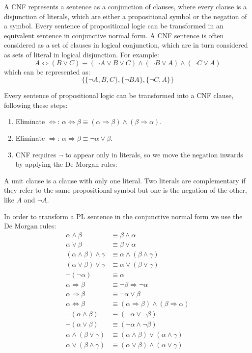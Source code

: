 \documentclass{article}
\begin{document}
A CNF represents a sentence as a conjunction of clauses, where every clause is a disjunction of literals, which are either a propositional symbol or the negation of a symbol. Every sentence of propositional logic can be transformed in an equivalent sentence in conjunctive normal form. A CNF sentence is often considered as a set of clauses in logical conjunction, which are in turn considered as sets of literal in logical disjunction. For example:
    \[A\Leftrightarrow(B\lor C) \equiv (\neg A \lor B \lor C) \land (\neg B \lor A) \land (\neg C \lor A)\]
which can be represented as:
    \[\{\{\neg A, B, C\}, \{\neg B A\}, \{\neg C, A\}\}\]

Every sentence of propositional logic can be transformed into a CNF clause, following these steps:
\begin{enumerate}
    \item Eliminate $\Leftrightarrow$: $\alpha \Leftrightarrow \beta \equiv (\alpha \Rightarrow \beta) \land (\beta \Rightarrow \alpha)$.
    \item Eliminate $\Rightarrow$: $\alpha \Rightarrow \beta \equiv \neg \alpha \lor \beta$.
    \item CNF requires $\neg$ to appear only in literals, so we move the negation inwards by applying the De Morgan rules:
    
\end{enumerate}

A unit clause is a clause with only one literal. Two literals are complementary if they refer to the same propositional symbol but one is the negation of the other, like \textit{A} and $\neg A$.

In order to transform a PL sentence in the conjunctive normal form we use the De Morgan rules:
\begin{align*}
    \alpha \land \beta &\equiv \beta \land \alpha \\
    \alpha \lor \beta &\equiv \beta \lor \alpha \\
    (\alpha \land \beta)\land \gamma &\equiv \alpha \land (\beta \land \gamma) \\
    (\alpha \lor \beta)\lor \gamma &\equiv \alpha \lor (\beta \lor \gamma) \\
    \neg (\neg \alpha) &\equiv \alpha \\
    \alpha \Rightarrow \beta &\equiv \neg \beta \Rightarrow \neg \alpha \\
    \alpha \Rightarrow \beta &\equiv \neg \alpha \lor \beta \\
    \alpha\Leftrightarrow\beta &\equiv (\alpha\Rightarrow\beta) \land (\beta\Rightarrow\alpha) \\
    \neg (\alpha \land \beta) &\equiv (\neg \alpha \lor \neg \beta) \\
    \neg (\alpha \lor \beta) &\equiv (\neg \alpha \land \neg \beta) \\
    \alpha \land (\beta \lor \gamma) &\equiv (\alpha\land\beta)\lor(\alpha\land\gamma) \\
    \alpha \lor (\beta \land \gamma) &\equiv (\alpha \lor \beta)\land(\alpha \lor \gamma)
\end{align*}
\end{document}
